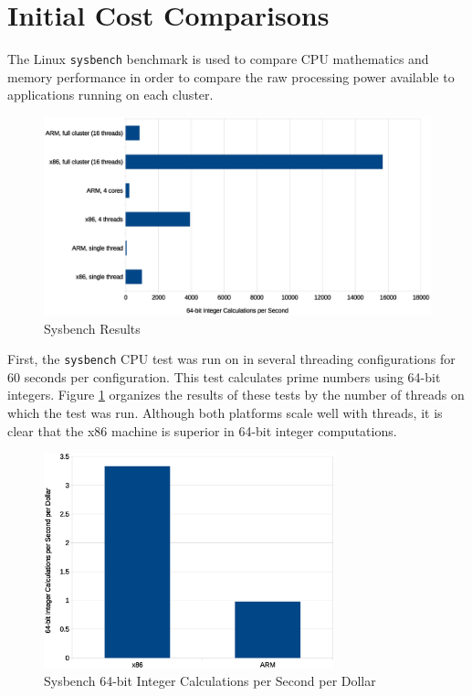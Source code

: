 \documentclass[11pt]{book}
\begin{document}
\section{Initial Cost Comparisons}

The Linux \verb;sysbench; benchmark is used to compare CPU mathematics and memory
performance in order to compare the raw processing power available to applications running
on each cluster.

\begin{figure}
\centering
\includegraphics[width=\textwidth]{sysbench_all}
\caption{Sysbench Results}
\label{sysbench-all}
\end{figure}

First, the \verb;sysbench; CPU test was run on in several threading configurations for 60
seconds per configuration.  This test calculates prime numbers using 64-bit integers.
Figure \ref{sysbench-all} organizes the results of these tests by the number of threads on
which the test was run. Although both platforms scale well with threads, it is clear that
the x86 machine is superior in 64-bit integer computations.

\begin{figure}
\centering
\includegraphics[width=0.75\textwidth]{sysbench_cost}
\caption{Sysbench 64-bit Integer Calculations per Second per Dollar}
\label{sysbench-cost}
\end{figure}
\end{document}
